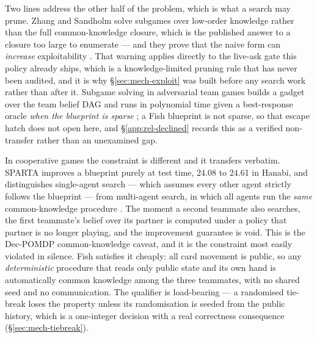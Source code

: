 Two lines address the other half of the problem, which is what a search may
prune. Zhang and Sandholm solve subgames over low-order knowledge rather than
the full common-knowledge closure, which is the published answer to a closure
too large to enumerate --- and they prove that the naive form can \emph{increase}
exploitability \cite{zhang2021subgamesolvingwithoutck}. That warning applies
directly to the live-ask gate this policy already ships, which is a
knowledge-limited pruning rule that has never been audited, and it is why
\S\ref{sec:mech-exploit} was built before any search work rather than after it.
Subgame solving in adversarial team games builds a gadget over the team belief
DAG and runs in polynomial time given a best-response oracle \emph{when the
blueprint is sparse} \cite{zhang2022teamsubgame}; a Fish blueprint is not
sparse, so that escape hatch does not open here, and \S\ref{app:rel-declined}
records this as a verified non-transfer rather than an unexamined gap.

In cooperative games the constraint is different and it transfers verbatim.
SPARTA improves a blueprint purely at test time, 24.08 to 24.61 in Hanabi, and
distinguishes single-agent search --- which assumes every other agent strictly
follows the blueprint --- from multi-agent search, in which all agents run the
\emph{same} common-knowledge procedure \cite{lerer2020sparta}. The moment a
second teammate also searches, the first teammate's belief over its partner is
computed under a policy that partner is no longer playing, and the improvement
guarantee is void. This is the Dec-POMDP common-knowledge caveat, and it is the
constraint most easily violated in silence. Fish satisfies it cheaply: all card
movement is public, so any \emph{deterministic} procedure that reads only public
state and its own hand is automatically common knowledge among the three
teammates, with no shared seed and no communication. The qualifier is
load-bearing --- a randomised tie-break loses the property unless its
randomisation is seeded from the public history, which is a one-integer decision
with a real correctness consequence (\S\ref{sec:mech-tiebreak}).

